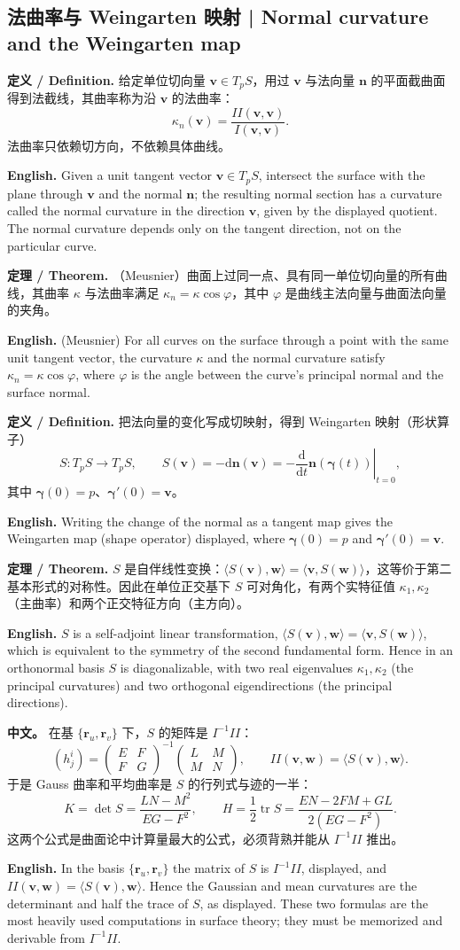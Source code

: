 \documentclass[UTF8,11pt,a4paper]{ctexart}
\newcommand{\APS}[2]{\par\noindent\textbf{中文。} #1\par\noindent\textbf{English.} #2\par\smallskip}
\newcommand{\EN}[1]{\par\noindent \textbf{English.} #1\par}
\newcommand{\DEF}[2]{\par\noindent\textbf{定义 / Definition.} #1\par\EN{#2}\par\smallskip}
\newcommand{\THM}[2]{\par\noindent\textbf{定理 / Theorem.} #1\par\EN{#2}\par\smallskip}
\newcommand{\dd}{\mathrm{d}}
\newcommand{\br}{\mathbf{r}}
\newcommand{\bn}{\mathbf{n}}
\newcommand{\bv}{\mathbf{v}}
\newcommand{\bw}{\mathbf{w}}
\newcommand{\bgamma}{\boldsymbol{\gamma}}
\begin{document}
\subsection{法曲率与 Weingarten 映射 | Normal curvature and the Weingarten map}
\DEF{给定单位切向量 $\bv\in T_pS$，用过 $\bv$ 与法向量 $\bn$ 的平面截曲面得到法截线，其曲率称为沿 $\bv$ 的法曲率：
\[
\kappa_n(\bv)=\frac{II(\bv,\bv)}{I(\bv,\bv)} .
\]
法曲率只依赖切方向，不依赖具体曲线。}{Given a unit tangent vector $\bv\in T_pS$, intersect the surface with the plane through $\bv$ and the normal $\bn$; the resulting normal section has a curvature called the normal curvature in the direction $\bv$, given by the displayed quotient. The normal curvature depends only on the tangent direction, not on the particular curve.}
\THM{（Meusnier）曲面上过同一点、具有同一单位切向量的所有曲线，其曲率 $\kappa$ 与法曲率满足 $\kappa_n=\kappa\cos\varphi$，其中 $\varphi$ 是曲线主法向量与曲面法向量的夹角。}{(Meusnier) For all curves on the surface through a point with the same unit tangent vector, the curvature $\kappa$ and the normal curvature satisfy $\kappa_n=\kappa\cos\varphi$, where $\varphi$ is the angle between the curve's principal normal and the surface normal.}
\DEF{把法向量的变化写成切映射，得到 Weingarten 映射（形状算子）
\[
S:T_pS\to T_pS,\qquad S(\bv)=-\dd\bn(\bv)=-\left.\frac{\dd}{\dd t}\bn(\bgamma(t))\right|_{t=0},
\]
其中 $\bgamma(0)=p$、$\bgamma'(0)=\bv$。}{Writing the change of the normal as a tangent map gives the Weingarten map (shape operator) displayed, where $\bgamma(0)=p$ and $\bgamma'(0)=\bv$.}
\THM{$S$ 是自伴线性变换：$\langle S(\bv),\bw\rangle=\langle\bv,S(\bw)\rangle$，这等价于第二基本形式的对称性。因此在单位正交基下 $S$ 可对角化，有两个实特征值 $\kappa_1,\kappa_2$（主曲率）和两个正交特征方向（主方向）。}{$S$ is a self-adjoint linear transformation, $\langle S(\bv),\bw\rangle=\langle\bv,S(\bw)\rangle$, which is equivalent to the symmetry of the second fundamental form. Hence in an orthonormal basis $S$ is diagonalizable, with two real eigenvalues $\kappa_1,\kappa_2$ (the principal curvatures) and two orthogonal eigendirections (the principal directions).}
\APS{在基 $\{\br_u,\br_v\}$ 下，$S$ 的矩阵是 $I^{-1}II$：
\[
(h^i_j)=\begin{pmatrix}E&F\\F&G\end{pmatrix}^{-1}
\begin{pmatrix}L&M\\M&N\end{pmatrix},
\qquad
II(\bv,\bw)=\langle S(\bv),\bw\rangle .
\]
于是 Gauss 曲率和平均曲率是 $S$ 的行列式与迹的一半：
\[
K=\det S=\frac{LN-M^2}{EG-F^2},\qquad
H=\frac12\operatorname{tr}S=\frac{EN-2FM+GL}{2(EG-F^2)} .
\]
这两个公式是曲面论中计算量最大的公式，必须背熟并能从 $I^{-1}II$ 推出。}{In the basis $\{\br_u,\br_v\}$ the matrix of $S$ is $I^{-1}II$, displayed, and $II(\bv,\bw)=\langle S(\bv),\bw\rangle$. Hence the Gaussian and mean curvatures are the determinant and half the trace of $S$, as displayed. These two formulas are the most heavily used computations in surface theory; they must be memorized and derivable from $I^{-1}II$.}
\end{document}

